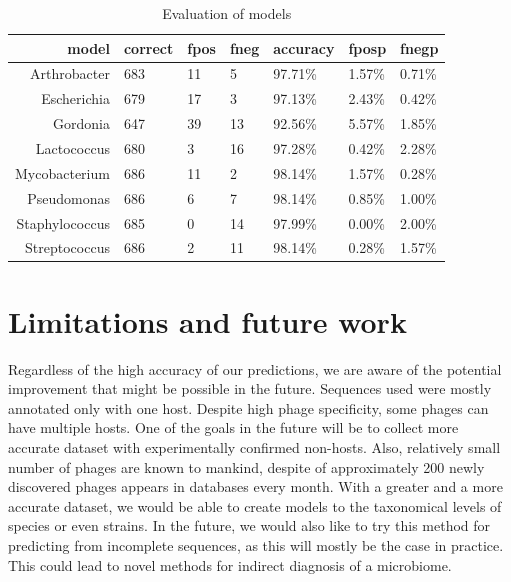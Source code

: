 \begin{table}
  \centering
    \begin{tabular}{ r l l l l l l }
	\hline
	model & correct & fpos & fneg & accuracy & fposp & fnegp \\
	\hline
	Arthrobacter & 683 & 11 & 5  & 97.71\% & 1.57\% & 0.71\% \\
	Escherichia & 679 & 17 & 3  & 97.13\% & 2.43\% & 0.42\% \\
	Gordonia & 647 & 39 & 13 & 92.56\% & 5.57\% & 1.85\% \\
	Lactococcus & 680 & 3  & 16 & 97.28\% & 0.42\% & 2.28\% \\
	Mycobacterium & 686 & 11 & 2  & 98.14\% & 1.57\% & 0.28\% \\
	Pseudomonas & 686 & 6  & 7  & 98.14\% & 0.85\% & 1.00\% \\
	Staphylococcus & 685 & 0  & 14 & 97.99\% & 0.00\% & 2.00\% \\
	Streptococcus & 686 & 2  & 11 & 98.14\% & 0.28\% & 1.57\% \\
	\end{tabular}
	\bigskip
    \caption{Evaluation of models}
    \label{tab:models}
\end{table}

\section{Limitations and future work}
Regardless of the high accuracy of our predictions, we are aware of the potential improvement that might be possible in the future.
Sequences used were mostly annotated only with one host.
Despite high phage specificity, some phages can have multiple hosts.
One of the goals in the future will be to collect more accurate dataset with experimentally confirmed non-hosts.
Also, relatively small number of phages are known to mankind, despite of approximately 200 newly discovered phages appears in databases every month. 
With a greater and a more accurate dataset, we would be able to create models to the taxonomical levels of species or even strains.
In the future, we would also like to try this method for predicting from incomplete sequences, as this will mostly be  the case in practice.
This could lead to novel methods for indirect diagnosis of a microbiome.

